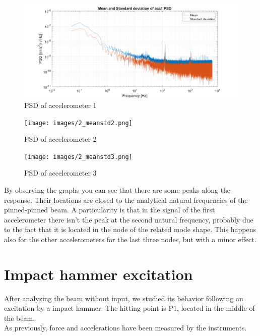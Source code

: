 \documentclass[11pt,a4paper]{article}
\begin{document}
\begin{enumerate}
	\begin{figure}[H]
		\centering
		\includegraphics[width=150mm]{images/2_meanstd1.png}
		\caption{PSD of accelerometer 1}
	\end{figure}

	\begin{figure}[H]
		\centering
		\texttt{[image: images/2\_meanstd2.png]}
		\caption{PSD of accelerometer 2}
	\end{figure}
	
	\begin{figure}[H]
		\centering
		\texttt{[image: images/2\_meanstd3.png]}
		\caption{PSD of accelerometer 3}
	\end{figure}

	By observing the graphs you can see that there are some peaks along the response. Their locations are closed to the analytical natural frequencies of the pinned-pinned beam. A particularity is that in the signal of the first accelerometer there isn't the peak at the second natural frequency, probably due to the fact that it is located in the node of the related mode shape. This happens also for the other accelerometers for the last three nodes, but with a minor effect. 
	
	
\end{enumerate}	

\newpage
\section{Impact hammer excitation}
After analyzing the beam without input, we studied its behavior following an excitation by a impact hammer. The hitting point is P1, located in the middle of the beam. \\
As previously, force and accelerations have been measured by the instruments. 
    
\end{document}
